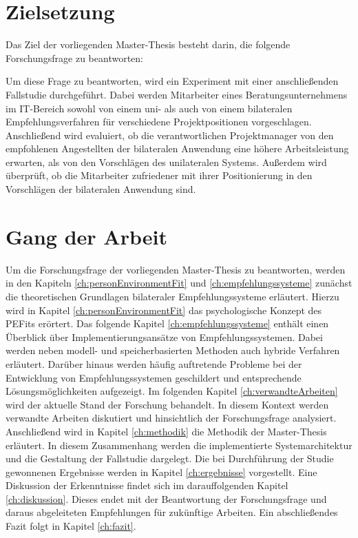 \newpage
\section{Zielsetzung}
\label{sec:intro:zielsetzung}
Das Ziel der vorliegenden Master-Thesis besteht darin, die folgende Forschungsfrage zu beantworten:

\forschungsfrage

Um diese Frage zu beantworten, wird ein Experiment mit einer anschließenden Fallstudie durchgeführt. Dabei werden Mitarbeiter eines Beratungsunternehmens im IT-Bereich sowohl von einem uni- als auch von einem bilateralen Empfehlungsverfahren für verschiedene Projektpositionen vorgeschlagen. Anschließend wird evaluiert, ob die verantwortlichen Projektmanager von den empfohlenen Angestellten der bilateralen Anwendung eine höhere Arbeitsleistung erwarten, als von den Vorschlägen des unilateralen Systems. Außerdem wird überprüft, ob die Mitarbeiter zufriedener mit ihrer Positionierung in den Vorschlägen der bilateralen Anwendung sind.

\section{Gang der Arbeit}
\label{sec:intro:gangDerArbeit}
Um die Forschungsfrage der vorliegenden Master-Thesis zu beantworten, werden in den Kapiteln \ref{ch:personEnvironmentFit} und \ref{ch:empfehlungssysteme} zunächst die theoretischen Grundlagen bilateraler Empfehlungssysteme erläutert. Hierzu wird in Kapitel \ref{ch:personEnvironmentFit} das psychologische Konzept des \acp{PEFit} erörtert. Das folgende Kapitel \ref{ch:empfehlungssysteme} enthält einen Überblick über Implementierungsansätze von Empfehlungssystemen. Dabei werden neben modell- und speicherbasierten Methoden auch hybride Verfahren erläutert. Darüber hinaus werden häufig auftretende Probleme bei der Entwicklung von Empfehlungssystemen geschildert und entsprechende Lösungsmöglichkeiten aufgezeigt. Im folgenden Kapitel \ref{ch:verwandteArbeiten} wird der aktuelle Stand der Forschung behandelt. In diesem Kontext werden verwandte Arbeiten diskutiert und hinsichtlich der Forschungsfrage analysiert. Anschließend wird in Kapitel \ref{ch:methodik} die Methodik der Master-Thesis erläutert. In diesem Zusammenhang werden die implementierte Systemarchitektur und die Gestaltung der Fallstudie dargelegt. Die bei Durchführung der Studie gewonnenen Ergebnisse werden in Kapitel \ref{ch:ergebnisse} vorgestellt. Eine Diskussion der Erkenntnisse findet sich im darauffolgenden Kapitel \ref{ch:diskussion}. Dieses endet mit der Beantwortung der Forschungsfrage und daraus abgeleiteten Empfehlungen für zukünftige Arbeiten. Ein abschließendes Fazit folgt in Kapitel \ref{ch:fazit}.
